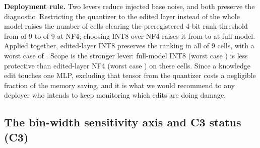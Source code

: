 \documentclass[preprint,12pt]{elsarticle}
\begin{document}
\textbf{Deployment rule.} Two levers reduce injected base noise, and both preserve the
diagnostic. Restricting the quantizer to the edited layer instead of the whole model
raises the number of cells clearing the preregistered 4-bit rank threshold from
\pNPassNfFM{} of 9 to \pNPassNfEL{} of 9 at NF4; choosing INT8 over NF4 raises it from
\pNPassNfFM{} to \pNPassIntFM{} at full model. Applied together, edited-layer INT8
preserves the ranking in all \pNPassIntEL{} of 9 cells, with a worst case of
\pMinFlatIntEL{}. Scope is the stronger lever: full-model INT8
(worst case \pMinFlatIntFM{}) is less protective than edited-layer NF4
(worst case \pMinFlatNfEL{}) on these cells. Since a knowledge edit touches one MLP,
excluding that tensor from the quantizer costs a negligible fraction of the memory
saving, and it is what we would recommend to any deployer who intends to keep
monitoring which edits are doing damage.

\subsection{The bin-width sensitivity axis and C3 status (C3)}
\label{sec:c3}
\end{document}
